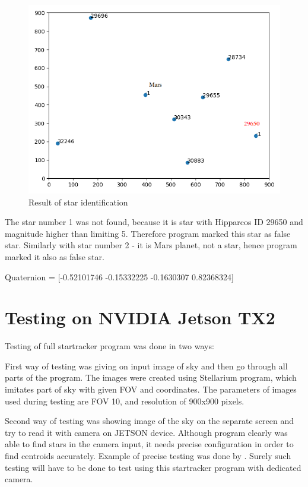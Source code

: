 \documentclass[12pt,a4paper,oneside]{article}
\begin{document}
\begin{figure}[!htbp]
\includegraphics[scale=0.6]{example_2.png}
\centering
\caption{Result of star identification}
\label{fig:example_2}
\end{figure}

The star number 1 was not found, because it is star with Hipparcos ID 29650 and magnitude higher than limiting 5. Therefore program marked this star as false star. Similarly with star number 2 - it is Mars planet, not a star, hence program marked it also as false star.

Quaternion = [-0.52101746 -0.15332225 -0.1630307   0.82368324]


\newpage
\section{Testing on NVIDIA Jetson TX2}

Testing of full startracker program was done in two ways:

First way of testing was giving on input image of sky and then go through all parts of the program. The images were created using Stellarium program, which imitates part of sky with given FOV and coordinates. The parameters of images used during testing are FOV 10\degree , and resolution of 900x900 pixels.

Second way of testing was showing image of the sky on the separate screen and try to read it with camera on JETSON device. Although program clearly was able to find stars in the camera input, it needs precise configuration in order to find centroids accurately. Example of precise testing was done by \citet{tappe2011star}. Surely such testing will have to be done to test using this startracker program with dedicated camera.
\end{document}
